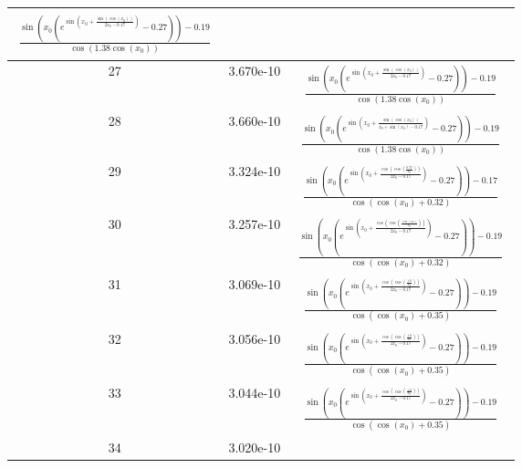 \begin{center}
\begin{tabular}{|c|c|c|}
$\begin{aligned}\frac{\sin{\left(x_{0} \left(e^{\sin{\left(x_{0} + \frac{\sin{\left(\cos{\left(x_{0} \right)} \right)}}{2 x_{0} - 0.17} \right)}} - 0.27\right) \right)} - 0.19}{\cos{\left(1.38 \cos{\left(x_{0} \right)} \right)}}\end{aligned}$\\ \hline27 & 3.670e-10 & $\begin{aligned}\frac{\sin{\left(x_{0} \left(e^{\sin{\left(x_{0} + \frac{\sin{\left(\cos{\left(x_{0} \right)} \right)}}{2 x_{0} - 0.17} \right)}} - 0.27\right) \right)} - 0.19}{\cos{\left(1.38 \cos{\left(x_{0} \right)} \right)}}\end{aligned}$\\ \hline28 & 3.660e-10 & $\begin{aligned}\frac{\sin{\left(x_{0} \left(e^{\sin{\left(x_{0} + \frac{\sin{\left(\cos{\left(x_{0} \right)} \right)}}{x_{0} + \sin{\left(x_{0} \right)} - 0.17} \right)}} - 0.27\right) \right)} - 0.19}{\cos{\left(1.38 \cos{\left(x_{0} \right)} \right)}}\end{aligned}$\\ \hline29 & 3.324e-10 & $\begin{aligned}\frac{\sin{\left(x_{0} \left(e^{\sin{\left(x_{0} + \frac{\cos{\left(\cos{\left(\frac{0.99}{x_{0}} \right)} \right)}}{2 x_{0} - 0.17} \right)}} - 0.27\right) \right)} - 0.17}{\cos{\left(\cos{\left(x_{0} \right)} + 0.32 \right)}}\end{aligned}$\\ \hline30 & 3.257e-10 & $\begin{aligned}\frac{\sin{\left(x_{0} \left(e^{\sin{\left(x_{0} + \frac{\cos{\left(\cos{\left(\frac{\cos{\left(x_{0} \right)}}{x_{0}} \right)} \right)}}{2 x_{0} - 0.17} \right)}} - 0.27\right) \right)} - 0.19}{\cos{\left(\cos{\left(x_{0} \right)} + 0.32 \right)}}\end{aligned}$\\ \hline31 & 3.069e-10 & $\begin{aligned}\frac{\sin{\left(x_{0} \left(e^{\sin{\left(x_{0} + \frac{\cos{\left(\cos{\left(\frac{1.0}{x_{0}} \right)} \right)}}{2 x_{0} - 0.17} \right)}} - 0.27\right) \right)} - 0.19}{\cos{\left(\cos{\left(x_{0} \right)} + 0.35 \right)}}\end{aligned}$\\ \hline32 & 3.056e-10 & $\begin{aligned}\frac{\sin{\left(x_{0} \left(e^{\sin{\left(x_{0} + \frac{\cos{\left(\cos{\left(\frac{1.0}{x_{0}} \right)} \right)}}{2 x_{0} - 0.17} \right)}} - 0.27\right) \right)} - 0.19}{\cos{\left(\cos{\left(x_{0} \right)} + 0.35 \right)}}\end{aligned}$\\ \hline33 & 3.044e-10 & $\begin{aligned}\frac{\sin{\left(x_{0} \left(e^{\sin{\left(x_{0} + \frac{\cos{\left(\cos{\left(\frac{1.0}{x_{0}} \right)} \right)}}{2 x_{0} - 0.17} \right)}} - 0.27\right) \right)} - 0.19}{\cos{\left(\cos{\left(x_{0} \right)} + 0.35 \right)}}\end{aligned}$\\ \hline34 & 3.020e-10 & 
\end{tabular}
\end{center}
